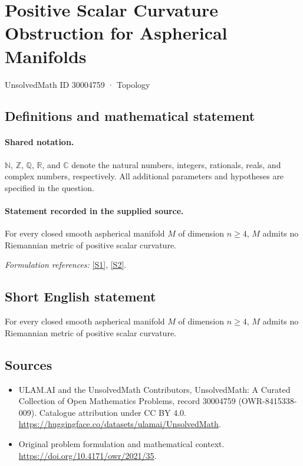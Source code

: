 \documentclass[11pt]{article}
\newcommand{\sref}[2]{\hyperlink{source:#1:#2}{[S#2]}}
\begin{document}
\setcounter{section}{30004758}
\section{Positive Scalar Curvature Obstruction for Aspherical Manifolds}\label{30004759}
{\small UnsolvedMath ID 30004759 · Topology}
\subsection{Definitions and mathematical statement}

\paragraph{Shared notation.}$\mathbb N$, $\mathbb Z$, $\mathbb Q$, $\mathbb R$, and $\mathbb C$ denote the natural numbers, integers, rationals, reals, and complex numbers, respectively. All additional parameters and hypotheses are specified in the question.


\paragraph{Statement recorded in the supplied source.}
For every closed smooth aspherical manifold $M$ of dimension $n\geq 4$, $M$ admits no Riemannian metric of positive scalar curvature.
\par\smallskip\textit{Formulation references:} \sref{30004759}{1}, \sref{30004759}{2}.
\subsection{Short English statement}
For every closed smooth aspherical manifold $M$ of dimension $n\geq 4$, $M$ admits no Riemannian metric of positive scalar curvature.
\subsection{Sources}
\begin{itemize}
\item[\hypertarget{source:30004759:1}{S1}] ULAM.AI and the UnsolvedMath Contributors, UnsolvedMath: A Curated Collection of Open Mathematics Problems, record 30004759 (OWR-8415338-009). Catalogue attribution under CC BY 4.0.
\url{https://huggingface.co/datasets/ulamai/UnsolvedMath}.
\item[\hypertarget{source:30004759:2}{S2}] Original problem formulation and mathematical context.
\url{https://doi.org/10.4171/owr/2021/35}.
\end{itemize}
\label{end:30004759}
\end{document}
